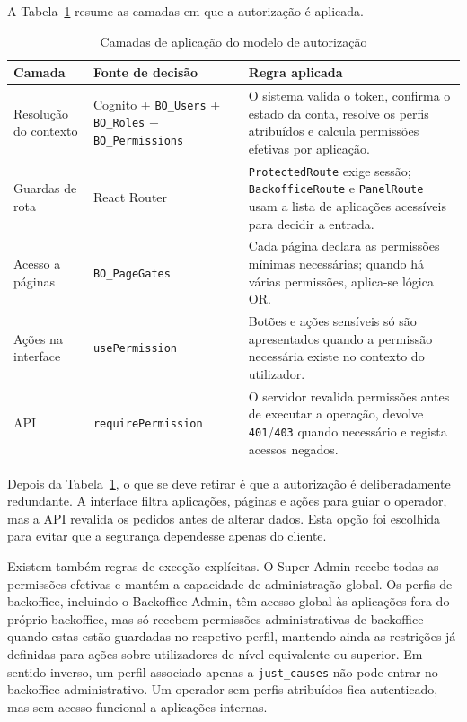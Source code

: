 A Tabela~\ref{tab:camadas_autorizacao} resume as camadas em que a autorização é aplicada.

\begin{table}[H]
\caption{Camadas de aplicação do modelo de autorização}
\label{tab:camadas_autorizacao}
\begin{center}
\small
\begin{tabular}{|p{3cm}|p{3.4cm}|p{7cm}|}
\hline
\textbf{Camada} & \textbf{Fonte de decisão} & \textbf{Regra aplicada} \\ \hline
Resolução do contexto & Cognito + \texttt{BO\_Users} + \texttt{BO\_Roles} + \texttt{BO\_Permissions} & O sistema valida o token, confirma o estado da conta, resolve os perfis atribuídos e calcula permissões efetivas por aplicação. \\ \hline
Guardas de rota & React Router & \texttt{ProtectedRoute} exige sessão; \texttt{BackofficeRoute} e \texttt{PanelRoute} usam a lista de aplicações acessíveis para decidir a entrada. \\ \hline
Acesso a páginas & \texttt{BO\_PageGates} & Cada página declara as permissões mínimas necessárias; quando há várias permissões, aplica-se lógica OR. \\ \hline
Ações na interface & \texttt{usePermission} & Botões e ações sensíveis só são apresentados quando a permissão necessária existe no contexto do utilizador. \\ \hline
\gls{API} & \texttt{requirePermission} & O servidor revalida permissões antes de executar a operação, devolve \texttt{401}/\texttt{403} quando necessário e regista acessos negados. \\ \hline
\end{tabular}
\end{center}
\end{table}

Depois da Tabela~\ref{tab:camadas_autorizacao}, o que se deve retirar é que a autorização é deliberadamente redundante. A interface filtra aplicações, páginas e ações para guiar o operador, mas a \gls{API} revalida os pedidos antes de alterar dados. Esta opção foi escolhida para evitar que a segurança dependesse apenas do cliente.

Existem também regras de exceção explícitas. O Super Admin recebe todas as permissões efetivas e mantém a capacidade de administração global. Os perfis de backoffice, incluindo o Backoffice Admin, têm acesso global às aplicações fora do próprio backoffice, mas só recebem permissões administrativas de backoffice quando estas estão guardadas no respetivo perfil, mantendo ainda as restrições já definidas para ações sobre utilizadores de nível equivalente ou superior. Em sentido inverso, um perfil associado apenas a \texttt{just\_causes} não pode entrar no backoffice administrativo. Um operador sem perfis atribuídos fica autenticado, mas sem acesso funcional a aplicações internas.

